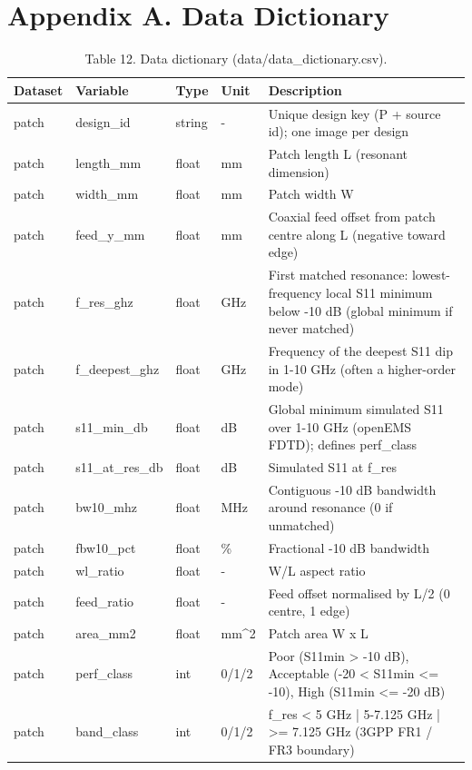 \documentclass[11pt,a4paper]{article}
\begin{document}
\section*{Appendix A. Data Dictionary}
\begin{table}[H]\centering\small
\caption*{Table 12. Data dictionary (data/data\_dictionary.csv).}
\begin{tabularx}{\linewidth}{XXXXX}
\toprule
\textbf{Dataset} & \textbf{Variable} & \textbf{Type} & \textbf{Unit} & \textbf{Description} \\
\midrule
patch & design\_id & string & - & Unique design key (P + source id); one image per design \\
patch & length\_mm & float & mm & Patch length L (resonant dimension) \\
patch & width\_mm & float & mm & Patch width W \\
patch & feed\_y\_mm & float & mm & Coaxial feed offset from patch centre along L (negative toward edge) \\
patch & f\_res\_ghz & float & GHz & First matched resonance: lowest-frequency local S11 minimum below -10 dB (global minimum if never matched) \\
patch & f\_deepest\_ghz & float & GHz & Frequency of the deepest S11 dip in 1-10 GHz (often a higher-order mode) \\
patch & s11\_min\_db & float & dB & Global minimum simulated S11 over 1-10 GHz (openEMS FDTD); defines perf\_class \\
patch & s11\_at\_res\_db & float & dB & Simulated S11 at f\_res \\
patch & bw10\_mhz & float & MHz & Contiguous -10 dB bandwidth around resonance (0 if unmatched) \\
patch & fbw10\_pct & float & \% & Fractional -10 dB bandwidth \\
patch & wl\_ratio & float & - & W/L aspect ratio \\
patch & feed\_ratio & float & - & Feed offset normalised by L/2 (0 centre, 1 edge) \\
patch & area\_mm2 & float & mm\textasciicircum{}2 & Patch area W x L \\
patch & perf\_class & int & 0/1/2 & Poor (S11min > -10 dB), Acceptable (-20 < S11min <= -10), High (S11min <= -20 dB) \\
patch & band\_class & int & 0/1/2 & f\_res < 5 GHz | 5-7.125 GHz | >= 7.125 GHz (3GPP FR1 / FR3 boundary) \\

\end{tabularx}
\end{table}
\end{document}
